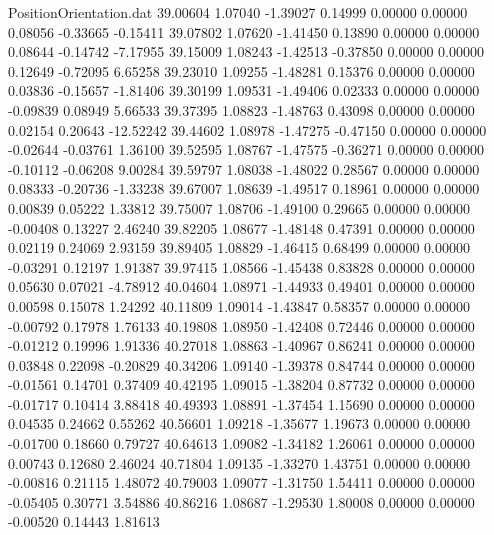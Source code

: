 \begin{filecontents}{PositionOrientation.dat}
  39.00604    1.07040   -1.39027     0.14999    0.00000    0.00000    0.08056   -0.33665   -0.15411
  39.07802    1.07620   -1.41450     0.13890    0.00000    0.00000    0.08644   -0.14742   -7.17955
  39.15009    1.08243   -1.42513    -0.37850    0.00000    0.00000    0.12649   -0.72095    6.65258
  39.23010    1.09255   -1.48281     0.15376    0.00000    0.00000    0.03836   -0.15657   -1.81406
  39.30199    1.09531   -1.49406     0.02333    0.00000    0.00000   -0.09839    0.08949    5.66533
  39.37395    1.08823   -1.48763     0.43098    0.00000    0.00000    0.02154    0.20643  -12.52242
  39.44602    1.08978   -1.47275    -0.47150    0.00000    0.00000   -0.02644   -0.03761    1.36100
  39.52595    1.08767   -1.47575    -0.36271    0.00000    0.00000   -0.10112   -0.06208    9.00284
  39.59797    1.08038   -1.48022     0.28567    0.00000    0.00000    0.08333   -0.20736   -1.33238
  39.67007    1.08639   -1.49517     0.18961    0.00000    0.00000    0.00839    0.05222    1.33812
  39.75007    1.08706   -1.49100     0.29665    0.00000    0.00000   -0.00408    0.13227    2.46240
  39.82205    1.08677   -1.48148     0.47391    0.00000    0.00000    0.02119    0.24069    2.93159
  39.89405    1.08829   -1.46415     0.68499    0.00000    0.00000   -0.03291    0.12197    1.91387
  39.97415    1.08566   -1.45438     0.83828    0.00000    0.00000    0.05630    0.07021   -4.78912
  40.04604    1.08971   -1.44933     0.49401    0.00000    0.00000    0.00598    0.15078    1.24292
  40.11809    1.09014   -1.43847     0.58357    0.00000    0.00000   -0.00792    0.17978    1.76133
  40.19808    1.08950   -1.42408     0.72446    0.00000    0.00000   -0.01212    0.19996    1.91336
  40.27018    1.08863   -1.40967     0.86241    0.00000    0.00000    0.03848    0.22098   -0.20829
  40.34206    1.09140   -1.39378     0.84744    0.00000    0.00000   -0.01561    0.14701    0.37409
  40.42195    1.09015   -1.38204     0.87732    0.00000    0.00000   -0.01717    0.10414    3.88418
  40.49393    1.08891   -1.37454     1.15690    0.00000    0.00000    0.04535    0.24662    0.55262
  40.56601    1.09218   -1.35677     1.19673    0.00000    0.00000   -0.01700    0.18660    0.79727
  40.64613    1.09082   -1.34182     1.26061    0.00000    0.00000    0.00743    0.12680    2.46024
  40.71804    1.09135   -1.33270     1.43751    0.00000    0.00000   -0.00816    0.21115    1.48072
  40.79003    1.09077   -1.31750     1.54411    0.00000    0.00000   -0.05405    0.30771    3.54886
  40.86216    1.08687   -1.29530     1.80008    0.00000    0.00000   -0.00520    0.14443    1.81613

\end{filecontents}
